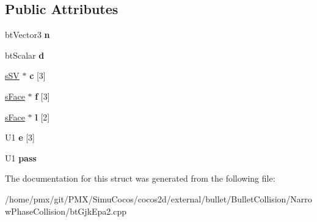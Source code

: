\subsection*{Public Attributes}
\begin{DoxyCompactItemize}
\item 
\mbox{\label{structgjkepa2__impl_1_1EPA_1_1sFace_a7242f9c39910b760329d56a846cb2084}} 
bt\+Vector3 {\bfseries n}
\item 
\mbox{\label{structgjkepa2__impl_1_1EPA_1_1sFace_a5aa2572578985a659d54766dd230f0b6}} 
bt\+Scalar {\bfseries d}
\item 
\mbox{\label{structgjkepa2__impl_1_1EPA_1_1sFace_abde121ff9ab6e987af62d201f4e11b4b}} 
\hyperlink{structgjkepa2__impl_1_1GJK_1_1sSV}{s\+SV} $\ast$ {\bfseries c} \mbox{[}3\mbox{]}
\item 
\mbox{\label{structgjkepa2__impl_1_1EPA_1_1sFace_a8e66ed87024afa716eea0cb6aaf75c96}} 
\hyperlink{structgjkepa2__impl_1_1EPA_1_1sFace}{s\+Face} $\ast$ {\bfseries f} \mbox{[}3\mbox{]}
\item 
\mbox{\label{structgjkepa2__impl_1_1EPA_1_1sFace_abba40edc9397fe52ba4ea37c85e166e3}} 
\hyperlink{structgjkepa2__impl_1_1EPA_1_1sFace}{s\+Face} $\ast$ {\bfseries l} \mbox{[}2\mbox{]}
\item 
\mbox{\label{structgjkepa2__impl_1_1EPA_1_1sFace_a81d623f8eca043ad973a9cdd6f791e8a}} 
U1 {\bfseries e} \mbox{[}3\mbox{]}
\item 
\mbox{\label{structgjkepa2__impl_1_1EPA_1_1sFace_a6a0ef1327923a6ac1b8b9a88c36234f8}} 
U1 {\bfseries pass}
\end{DoxyCompactItemize}


The documentation for this struct was generated from the following file\+:\begin{DoxyCompactItemize}
\item 
/home/pmx/git/\+P\+M\+X/\+Simu\+Cocos/cocos2d/external/bullet/\+Bullet\+Collision/\+Narrow\+Phase\+Collision/bt\+Gjk\+Epa2.\+cpp\end{DoxyCompactItemize}
